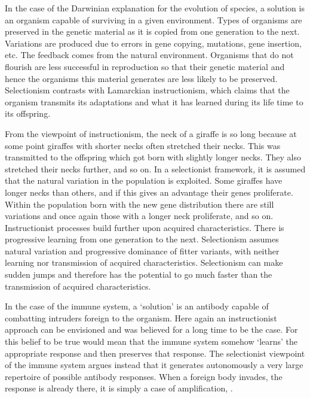 In the case of the Darwinian explanation for the 
evolution of species, a solution is an organism 
capable of surviving in a given environment. Types 
of organisms are preserved in the genetic material as 
it is copied from one generation to the next. 
Variations are produced due to errors in gene copying, 
mutations, gene insertion, etc. The feedback comes
from the natural environment. Organisms that do not flourish are
less successful in reproduction so that their
genetic material and hence the organisms 
this material generates are less likely to be preserved. 
Selectionism contrasts with Lamarckian instructionism, which 
claims that the organism transmits its adaptations 
and what it has learned during its life time to 
its offspring. 

From the viewpoint of instructionism, the
neck of a giraffe is so long because at some point
giraffes with shorter necks often stretched
their necks. This was transmitted
to the offspring which got born with slightly longer necks.
They also stretched their necks further, 
and so on. In a selectionist framework, it is assumed
that the natural variation in the population 
is exploited. Some giraffes have longer necks than 
others, and if this gives an advantage 
their genes proliferate. Within the population born with the 
new gene distribution there are still variations and 
once again those with a longer neck proliferate, and so on. 
Instructionist processes build further upon acquired characteristics. 
There is progressive learning from one 
generation to the next. Selectionism assumes natural 
variation and progressive dominance of fitter variants, with 
neither learning nor transmission of acquired characteristics. 
Selectionism can make sudden jumps and therefore has the 
potential to go much faster than the transmission of acquired
characteristics. 

In the case of the immune system, a `solution' is an 
antibody capable of combatting intruders foreign to the 
organism. Here again an instructionist approach can 
be envisioned and was believed for a long time to be 
the case. For this belief to be true would mean that
the immune system somehow `learns'
the appropriate response
and then preserves that response. The selectionist viewpoint
of the immune system argues instead that it
generates autonomously 
a very large repertoire of possible antibody responses. 
When a foreign body invades, the response 
is already 
there, it is simply a case
of amplification, \cite{Varela:1988}. 

